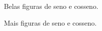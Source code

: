 \documentclass{article}
\begin{document}
\begin{figure}[ht!]
  \centering
  \caption{Belas figuras de seno e cosseno.}
  
\end{figure}

\clearpage

\begin{figure}[ht!]
  \centering
  \caption{Mais figuras de seno e cosseno.}
  
\end{figure}
\end{document}

